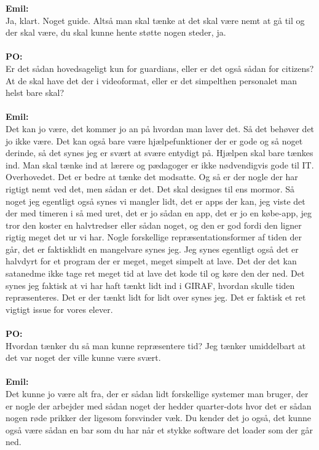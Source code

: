 \textbf{Emil:}\\
Ja, klart.
Noget guide.
Altså man skal tænke at det skal være nemt at gå til og der skal være, du skal kunne hente støtte nogen steder, ja.
\\\\
\textbf{PO:}\\
Er det sådan hovedsageligt kun for guardians, eller er det også sådan for citizens? At de skal have det der i videoformat, eller er det simpelthen personalet man helst bare skal?
\\\\
\textbf{Emil:}\\
Det kan jo være, det kommer jo an på hvordan man laver det.
Så det behøver det jo ikke være.
Det kan også bare være hjælpefunktioner der er gode og så noget derinde, så det synes jeg er svært at svære entydigt på.
Hjælpen skal bare tænkes ind.
Man skal tænke ind at lærere og pædagoger er ikke nødvendigvis gode til IT.
Overhovedet.
Det er bedre at tænke det modsatte. 
Og så er der nogle der har rigtigt nemt ved det, men sådan er det.
Det skal designes til ens mormor.
Så noget jeg egentligt også synes vi mangler lidt, det er apps der kan, jeg viste det der med timeren i så med uret, det er jo sådan en app, det er jo en købe-app, jeg tror den koster en halvtredser eller sådan noget, og den er god fordi den ligner rigtig meget det ur vi har.
Nogle forskellige repræsentationsformer af tiden der går, det er faktisklidt en mangelvare synes jeg.    
Jeg synes egentligt også det er halvdyrt for et program der er meget, meget simpelt at lave. 
Det der det kan satanedme ikke tage ret meget tid at lave det kode til og køre den der ned.
Det synes jeg faktisk at vi har haft tænkt lidt ind i GIRAF, hvordan skulle tiden repræsenteres.
Det er der tænkt lidt for lidt over synes jeg.  
Det er faktisk et ret vigtigt issue for vores elever. 
\\\\
\textbf{PO:}\\
Hvordan tænker du så man kunne repræsentere tid? 
Jeg tænker umiddelbart at det var noget der ville kunne være svært.
\\\\
\textbf{Emil:}\\
Det kunne jo være alt fra, der er sådan lidt forskellige systemer man bruger, der er nogle der arbejder med sådan noget der hedder quarter-dots hvor det er sådan nogen røde prikker der ligesom forsvinder væk.
Du kender det jo også, det kunne også være sådan en bar som du har når et stykke software det loader som der går ned.    
